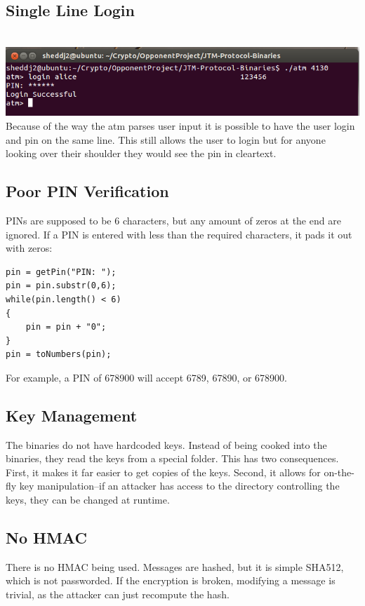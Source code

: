 \documentclass{article}
\begin{document}
\subsection{Single Line Login}
\\
\includegraphics[scale=0.65]{OneLineLogin.png}
\\
Because of the way the atm parses user input it is possible to have the user login and pin on the same line. This still allows the user to login but for anyone looking over their shoulder they would see the pin in cleartext.

\subsection{Poor PIN Verification}
PINs are supposed to be 6 characters, but any amount of zeros at the end are ignored. If a PIN is entered with less than the required characters, it pads it out with zeros:
\begin{lstlisting}
pin = getPin("PIN: ");
pin = pin.substr(0,6);
while(pin.length() < 6)
{
    pin = pin + "0";
}
pin = toNumbers(pin);
\end{lstlisting}
For example, a PIN of 678900 will accept 6789, 67890, or 678900.

\subsection{Key Management}
The binaries do not have hardcoded keys. Instead of being cooked into the binaries, they read the keys from a special folder. This has two consequences. First, it makes it far easier to get copies of the keys. Second, it allows for on-the-fly key manipulation--if an attacker has access to the directory controlling the keys, they can be changed at runtime.

\subsection{No HMAC}
There is no HMAC being used. Messages are hashed, but it is simple SHA512, which is not passworded. If the encryption is broken, modifying a message is trivial, as the attacker can just recompute the hash.
\end{document}
